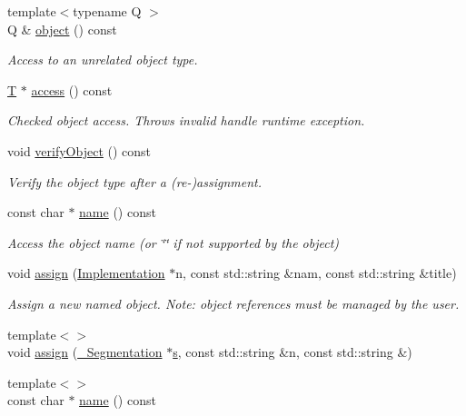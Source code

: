 \begin{DoxyCompactItemize}
{\footnotesize template$<$typename Q $>$ }\\Q \& \hyperlink{class_d_d4hep_1_1_handle_abef3218a7399500084fc290a711bf048}{object} () const
\begin{DoxyCompactList}\small\item\em Access to an unrelated object type. \end{DoxyCompactList}\item 
\hyperlink{class_t}{T} $\ast$ \hyperlink{class_d_d4hep_1_1_handle_a39887c8fde6e11652715e07951fa7849}{access} () const
\begin{DoxyCompactList}\small\item\em Checked object access. Throws invalid handle runtime exception. \end{DoxyCompactList}\item 
void \hyperlink{class_d_d4hep_1_1_handle_a0001c6eae622a62fb638a9e0a07ac150}{verify\+Object} () const
\begin{DoxyCompactList}\small\item\em Verify the object type after a (re-\/)assignment. \end{DoxyCompactList}\item 
const char $\ast$ \hyperlink{class_d_d4hep_1_1_handle_a27c7d467a609ab32c133e1f3c7d85ef5}{name} () const
\begin{DoxyCompactList}\small\item\em Access the object name (or \char`\"{}\char`\"{} if not supported by the object) \end{DoxyCompactList}\item 
void \hyperlink{class_d_d4hep_1_1_handle_a9f5b5d3feb89adf95fdfc4148c711209}{assign} (\hyperlink{class_d_d4hep_1_1_handle_ad7ff728a25806079516b8965b9113f1a}{Implementation} $\ast$n, const std\+::string \&nam, const std\+::string \&title)
\begin{DoxyCompactList}\small\item\em Assign a new named object. Note\+: object references must be managed by the user. \end{DoxyCompactList}\item 
{\footnotesize template$<$$>$ }\\void \hyperlink{class_d_d4hep_1_1_handle_a21f25f49cd2d12c4448006f5343b6999}{assign} (\hyperlink{_handle_8cpp_a2cf2a89ef24384817ed33748f1243510}{\+\_\+\+Segmentation} $\ast$\hyperlink{_volumes_8cpp_a17ca6bfc8040d695d3cada22a4763d40}{s}, const std\+::string \&n, const std\+::string \&)
\item 
{\footnotesize template$<$$>$ }\\const char $\ast$ \hyperlink{class_d_d4hep_1_1_handle_a1a15b80c3f3e7e739a70b99f60a42092}{name} () const
\end{DoxyCompactItemize}
